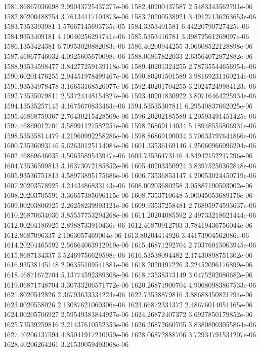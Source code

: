 {1581.86867036698 2.99043725437277e-06
1582.40200437587 2.5483343562791e-06
1582.80200488254 3.76134117104873e-06
1583.20200538921 3.49127136263653e-06
1583.7353393981 1.57667145693735e-05
1584.3353401581 6.44220790727425e-06
1584.9353409181 4.10040256294741e-06
1585.5353416781 3.39872561269097e-06
1586.1353424381 6.70953020882083e-06
1586.40200944255 3.06608522128898e-06
1587.46867746032 4.0925605670098e-06
1588.06867822033 2.63564072872882e-06
1588.93534598477 3.84277259139118e-06
1589.40201324255 2.78735544656954e-06
1590.60201476255 2.94451978499467e-06
1590.80201501589 3.98169231160214e-06
1591.93534978478 3.16653168526077e-06
1592.40201704255 3.20247249984123e-06
1592.73535079811 2.53724448154827e-06
1593.40201830922 3.80716464225934e-06
1594.13535257145 4.1675670833463e-06
1594.53535307811 6.29540837662025e-06
1595.46868759367 2.76430215428509e-06
1596.20202185589 4.20593491451425e-06
1597.46869012701 3.58991127582257e-06
1598.26869114034 5.18948555806931e-06
1598.53535814479 4.21960992258286e-06
1598.86869190034 3.70633797644866e-06
1600.73536093146 5.62630125114084e-06
1601.33536169146 4.25060966096204e-06
1602.46869646035 4.5065589543947e-06
1603.73536473146 4.84942152217296e-06
1604.73536599813 3.16373072185852e-06
1605.40203350924 3.83975250362848e-06
1605.93536751813 4.58973895175686e-06
1606.73536853147 4.20053024450719e-06
1607.20203578925 4.2443486833143e-06
1608.00203680258 3.05887190503002e-06
1608.20203705591 3.36657385696115e-06
1608.7353710648 5.00045053689176e-06
1609.00203806925 2.26258239993121e-06
1609.93537258481 2.76895974593637e-06
1610.26870634036 3.85557753294268e-06
1611.20204085592 2.49733218621444e-06
1612.00204186925 2.8988733910436e-06
1612.46870912703 3.78419436756044e-06
1612.8687096337 2.1063057469004e-06
1613.80204414926 3.44173904562086e-06
1614.20204465592 2.56664063912919e-06
1615.46871292704 2.70376015063945e-06
1615.8687134337 3.52469756629598e-06
1616.53538094482 2.17430898751302e-06
1616.93538145148 2.06355109541881e-06
1618.2020497226 3.22452096176899e-06
1618.46871672704 5.13774592389308e-06
1618.73538373149 3.0475202080682e-06
1619.06871748704 3.30733206571772e-06
1620.26871900704 4.90680983867533e-06
1621.8020542826 2.36793633334224e-06
1622.73538879816 3.88688450821794e-06
1623.0020558026 2.13087621060306e-06
1623.66872331372 2.48676014051165e-06
1624.00205706927 2.59549383844927e-06
1624.26872407372 3.6927850179852e-06
1625.73539259816 2.21437610552353e-06
1626.26872660705 3.83808903055864e-06
1627.40206137594 4.85041917210959e-06
1628.06872888706 3.72934791531207e-06
1628.40206264261 3.21539059493068e-06
}

